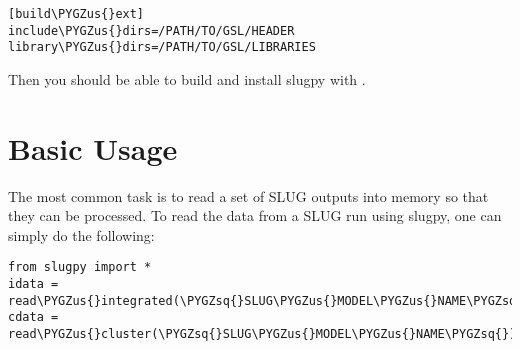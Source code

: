 \documentclass[letterpaper,10pt,english]{sphinxmanual}
\def\PYGZus{\char`\_}
\def\PYGZsq{\char`\'}
\renewcommand\PYGZsq{\textquotesingle}
\begin{document}
\begin{Verbatim}[commandchars=\\\{\}]
[build\PYGZus{}ext]
include\PYGZus{}dirs=/PATH/TO/GSL/HEADER
library\PYGZus{}dirs=/PATH/TO/GSL/LIBRARIES
\end{Verbatim}

Then you should be able to build and install slugpy with .


\section{Basic Usage}
\label{slugpy:basic-usage}
The most common task is to read a set of SLUG outputs into memory so that they can be processed. To read the data from a SLUG run using slugpy, one can simply do the following:

\begin{Verbatim}[commandchars=\\\{\}]
from slugpy import *
idata = read\PYGZus{}integrated(\PYGZsq{}SLUG\PYGZus{}MODEL\PYGZus{}NAME\PYGZsq{})
cdata = read\PYGZus{}cluster(\PYGZsq{}SLUG\PYGZus{}MODEL\PYGZus{}NAME\PYGZsq{})
\end{Verbatim}
\end{document}
